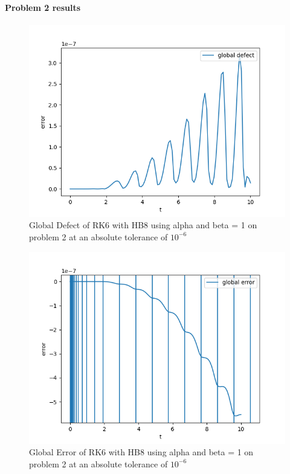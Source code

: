 \documentclass{article}
\begin{document}
\paragraph{Problem 2 results}
\begin{figure}[H]
\centering
\includegraphics[width=0.7\linewidth]{./figures/static_alpha_rk6_with_hb8_p2_global_defect}
\caption{Global Defect of RK6 with HB8 using alpha and beta = 1 on problem 2 at an absolute tolerance of $10^{-6}$}
\label{fig:static_alpha_rk6_with_hb8_p2_global_defect}
\end{figure}

\begin{figure}[H]
\centering
\includegraphics[width=0.7\linewidth]{./figures/static_alpha_rk6_with_hb8_p2_global_error}
\caption{Global Error of RK6 with HB8 using alpha and beta = 1 on problem 2 at an absolute tolerance of $10^{-6}$}
\label{fig:static_alpha_rk6_with_hb8_p2_global_error}
\end{figure}
\end{document}
